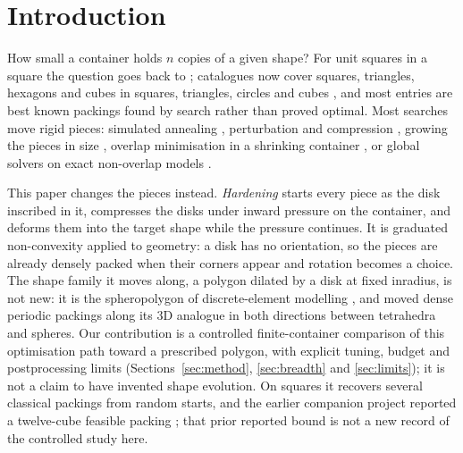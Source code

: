 \section{Introduction}
How small a container holds $n$ copies of a given shape? For unit squares in a square the question goes back to \citet{erdosgraham}; catalogues now cover squares, triangles, hexagons and cubes in squares, triangles, circles and cubes \citep{friedmancenter,squaresproject}, and most entries are best known packings found by search rather than proved optimal. Most searches move rigid pieces: simulated annealing \citep{kirkpatrick}, perturbation and compression \citep{Gensane2004,gensane}, growing the pieces in size \citep{lubachevsky}, overlap minimisation in a shrinking container \citep{Umetani2009,Gardeyn2025}, or global solvers on exact non-overlap models \citep{Berthold2026}.

This paper changes the pieces instead. \emph{Hardening} starts every piece as the disk inscribed in it, compresses the disks under inward pressure on the container, and deforms them into the target shape while the pressure continues. It is graduated non-convexity \citep{blake} applied to geometry: a disk has no orientation, so the pieces are already densely packed when their corners appear and rotation becomes a choice. The shape family it moves along, a polygon dilated by a disk at fixed inradius, is not new: it is the spheropolygon of discrete-element modelling \citep{AlonsoMarroquin2008}, and \citet{Jin2015} moved dense periodic packings along its 3D analogue in both directions between tetrahedra and spheres. Our contribution is a controlled finite-container comparison of this optimisation path toward a prescribed polygon, with explicit tuning, budget and postprocessing limits (Sections~\ref{sec:method}, \ref{sec:breadth} and \ref{sec:limits}); it is not a claim to have invented shape evolution. On squares it recovers several classical packings from random starts, and the earlier companion project reported a twelve-cube feasible packing \citep{softtorigidpacking}; that prior reported bound is not a new record of the controlled study here.

